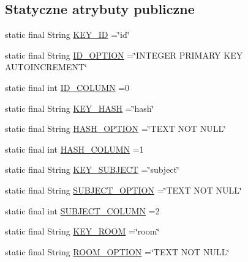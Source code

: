 \subsection*{Statyczne atrybuty publiczne}
\begin{DoxyCompactItemize}
\item 
static final String \hyperlink{classcom_1_1example_1_1qrpoll_1_1_sql_handler_ac68ddd9373f28e201126af152708a978}{K\+E\+Y\+\_\+\+I\+D} =\char`\"{}id\char`\"{}
\item 
static final String \hyperlink{classcom_1_1example_1_1qrpoll_1_1_sql_handler_aa5a0c822d90c20141ddadf6a396c332f}{I\+D\+\_\+\+O\+P\+T\+I\+O\+N} =\char`\"{}I\+N\+T\+E\+G\+E\+R P\+R\+I\+M\+A\+R\+Y K\+E\+Y A\+U\+T\+O\+I\+N\+C\+R\+E\+M\+E\+N\+T\char`\"{}
\item 
static final int \hyperlink{classcom_1_1example_1_1qrpoll_1_1_sql_handler_a2c504a59b0a9b6b99a26b181fa875460}{I\+D\+\_\+\+C\+O\+L\+U\+M\+N} =0
\item 
static final String \hyperlink{classcom_1_1example_1_1qrpoll_1_1_sql_handler_a300c5ab4aec2e6338f2ca3477c86821b}{K\+E\+Y\+\_\+\+H\+A\+S\+H} =\char`\"{}hash\char`\"{}
\item 
static final String \hyperlink{classcom_1_1example_1_1qrpoll_1_1_sql_handler_a5e06705347d09bc8a2a42b18b7ae2a39}{H\+A\+S\+H\+\_\+\+O\+P\+T\+I\+O\+N} =\char`\"{}T\+E\+X\+T N\+O\+T N\+U\+L\+L\char`\"{}
\item 
static final int \hyperlink{classcom_1_1example_1_1qrpoll_1_1_sql_handler_abec6f5e9cb2ce511c936dc1ae80c83f0}{H\+A\+S\+H\+\_\+\+C\+O\+L\+U\+M\+N} =1
\item 
static final String \hyperlink{classcom_1_1example_1_1qrpoll_1_1_sql_handler_a5f388a6da5567ff51d36f49536889787}{K\+E\+Y\+\_\+\+S\+U\+B\+J\+E\+C\+T} =\char`\"{}subject\char`\"{}
\item 
static final String \hyperlink{classcom_1_1example_1_1qrpoll_1_1_sql_handler_a285e762c9eafe65d7fd408a27909fe31}{S\+U\+B\+J\+E\+C\+T\+\_\+\+O\+P\+T\+I\+O\+N} =\char`\"{}T\+E\+X\+T N\+O\+T N\+U\+L\+L\char`\"{}
\item 
static final int \hyperlink{classcom_1_1example_1_1qrpoll_1_1_sql_handler_a8aceb6280c8a2a0b343b7e20f29b6a21}{S\+U\+B\+J\+E\+C\+T\+\_\+\+C\+O\+L\+U\+M\+N} =2
\item 
static final String \hyperlink{classcom_1_1example_1_1qrpoll_1_1_sql_handler_a78fbe309193399fb67d76eadb67f4b33}{K\+E\+Y\+\_\+\+R\+O\+O\+M} =\char`\"{}room\char`\"{}
\item 
static final String \hyperlink{classcom_1_1example_1_1qrpoll_1_1_sql_handler_a7c6a68ef75025eb240b041ea3f005e46}{R\+O\+O\+M\+\_\+\+O\+P\+T\+I\+O\+N} =\char`\"{}T\+E\+X\+T N\+O\+T N\+U\+L\+L\char`\"{}

\end{DoxyCompactItemize}
